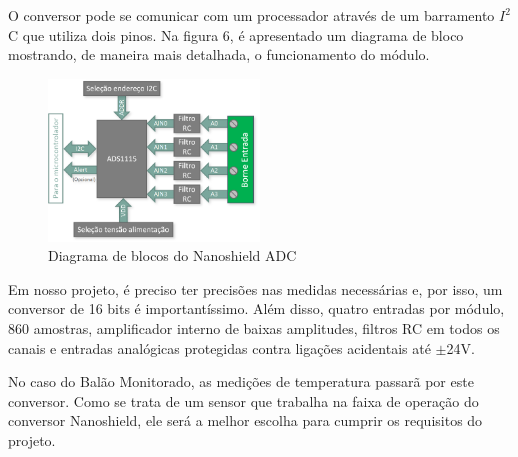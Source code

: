 			O conversor pode se comunicar com um processador através de um barramento $I^2$C que utiliza dois pinos. Na figura 6, é apresentado um diagrama de bloco  mostrando, de maneira mais detalhada, o funcionamento do módulo.

			\begin{figure}[h!]
				\centering
				\includegraphics[width=0.5\textwidth]{figuras/diagramaNanoshield}
				\caption{Diagrama de blocos do Nanoshield ADC}
				\label{img:diagramaNanoshield}
			\end{figure}

			Em nosso projeto, é preciso ter precisões nas medidas necessárias e, por isso, um conversor de 16 bits é importantíssimo. Além disso, quatro entradas por módulo, 860 amostras, amplificador interno de baixas amplitudes, filtros RC em todos os canais e entradas analógicas protegidas contra ligações acidentais até $\pm$24V.

			No caso do Balão Monitorado, as medições de temperatura passarã por este conversor. Como se trata de um sensor que trabalha na faixa de operação do conversor Nanoshield, ele será a melhor escolha para cumprir os requisitos do projeto.
